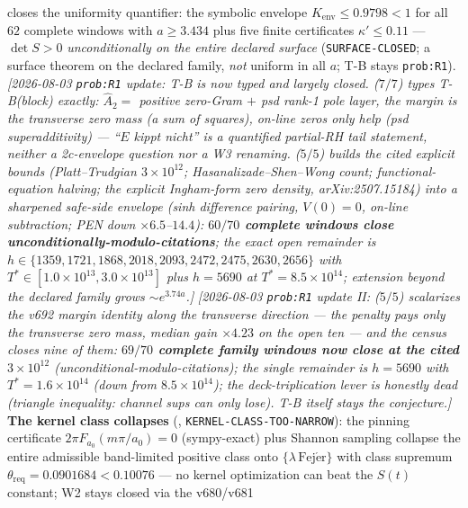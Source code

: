 \documentclass[11pt,a4paper]{article}
\begin{document}
 closes the uniformity quantifier:
the symbolic envelope $K_{\mathrm{env}}\le0.9798<1$ for all $62$
complete windows with $a\ge3.434$ plus five finite certificates
$\kappa'\le0.11$ --- $\det S>0$ \emph{unconditionally on the entire
declared surface} (\texttt{SURFACE-CLOSED}; a surface theorem on the
declared family, \emph{not} uniform in all $a$; T-B stays
\texttt{prob:R1}).  \emph{[2026-08-03 \texttt{prob:R1} update: T-B is
now typed and largely closed.  
($7/7$) types T-B(block) exactly: $\hat A_2=$ positive zero-Gram $+$
psd rank-1 pole layer, the margin \emph{is} the transverse zero mass
(a sum of squares), on-line zeros only help (psd superadditivity) ---
``$E$ kippt nicht'' is a \emph{quantified partial-RH tail} statement,
neither a 2c-envelope question nor a W3 renaming.
 ($5/5$) builds the cited
explicit bounds (Platt--Trudgian $3\times10^{12}$;
Hasanalizade--Shen--Wong count; functional-equation halving; the
explicit Ingham-form zero density, arXiv:2507.15184) into a sharpened
safe-side envelope (sinh difference pairing, $V(0)=0$, on-line
subtraction; PEN down $\times6.5$--$14.4$): \textbf{$60/70$ complete
windows close unconditionally-modulo-citations}; the exact open
remainder is $h\in\{1359,1721,1868,2018,2093,2472,2475,2630,2656\}$
with $T^*\in[1.0\times10^{13},3.0\times10^{13}]$ plus $h=5690$ at
$T^*=8.5\times10^{14}$; extension beyond the declared family grows
$\sim e^{3.74a}$.]}  \emph{[2026-08-03 \texttt{prob:R1} update II:
 ($5/5$) scalarizes the v692
margin identity along the transverse direction --- the penalty pays
only the transverse zero mass, median gain $\times4.23$ on the open
ten --- and the census closes nine of them: \textbf{$69/70$ complete
family windows now close at the cited $3\times10^{12}$}
(unconditional-modulo-citations); the single remainder is $h=5690$
with $T^*=1.6\times10^{14}$ (down from $8.5\times10^{14}$); the
deck-triplication lever is honestly dead (triangle inequality:
channel sups can only lose).  T-B itself stays the conjecture.]}  \textbf{The kernel class collapses}
(, \texttt{KERNEL-CLASS-TOO-NARROW}):
the pinning certificate $2\pi F_{a_0}(m\pi/a_0)=0$ (sympy-exact) plus
Shannon sampling collapse the entire admissible band-limited positive
class onto $\{\lambda\,\mathrm{Fej\acute er}\}$ with class supremum
$\theta_{\mathrm{req}}=0.0901684<0.10076$ --- no kernel optimization
can beat the $S(t)$ constant; W2 stays closed via the v680/v681
\end{document}
